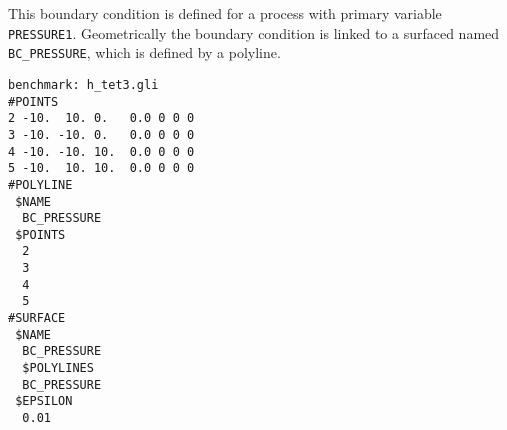 This boundary condition is defined for a process with primary
variable \texttt{PRESSURE1}. Geometrically the boundary condition
is linked to a surfaced named \texttt{BC\_PRESSURE}, which is
defined by a polyline.

\begin{verbatim}
benchmark: h_tet3.gli
#POINTS
2 -10.  10. 0.   0.0 0 0 0
3 -10. -10. 0.   0.0 0 0 0
4 -10. -10. 10.  0.0 0 0 0
5 -10.  10. 10.  0.0 0 0 0
#POLYLINE
 $NAME
  BC_PRESSURE
 $POINTS
  2
  3
  4
  5
#SURFACE
 $NAME
  BC_PRESSURE
  $POLYLINES
  BC_PRESSURE
 $EPSILON
  0.01
\end{verbatim}





